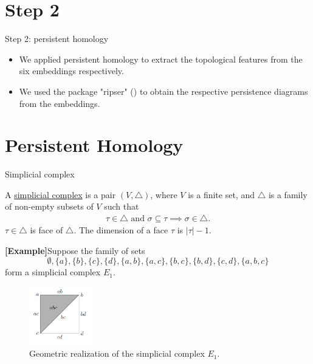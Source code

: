 \documentclass[xcolor={dvipsnames,svgnames}]{beamer}
\begin{document}
\section{Step 2}
\begin{frame}{Step 2: persistent homology}
\begin{itemize}
    \item We applied persistent homology to extract the topological features from the six embeddings respectively.

    \item We used the package "ripser" (\cite{ctralie2018ripser}) to obtain the respective persistence diagrams from the embeddings.
\end{itemize}
\end{frame}


\section{Persistent Homology}
\begin{frame}{Simplicial complex}
    
\begin{defn}
	A \underline{simplicial complex} is a pair $(V, \triangle)$, where $V$ is a finite set, and $\triangle$ is a family of non-empty subsets of $V$ such that 
	\begin{align}
	    \tau \in \triangle \text{ and }\sigma \subseteq \tau \implies \sigma \in \triangle.
	\end{align}
	$\tau \in \triangle $ is face of $\triangle$. The dimension of a face $\tau$ is $|\tau| - 1.$
	\end{defn}

\textbf{[Example]}Suppose the family of sets 
    $$\emptyset, \{a\},\{b\},\{c\}, \{d\}, \{a,b\}, \{a,c\}, \{b,c\}, \{b,d\}, \{c,d\}, \{a,b,c\}$$ form a simplicial complex $E_1$.
\begin{figure}[H]
        \centering \includegraphics[width=0.25\textwidth]{figures/E1.png}
            \caption{Geometric realization of the simplicial complex $E_1$.}
    \end{figure}
\end{frame}
\end{document}
